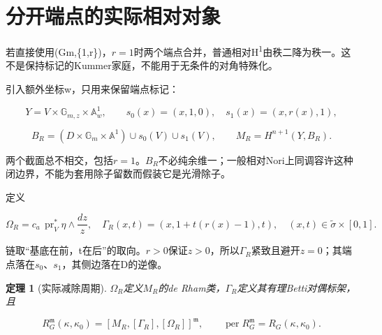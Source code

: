 \documentclass[11pt,a4paper,oneside]{ctexrep}
\theoremstyle{cnplain}
\newtheorem{theorem}{定理}[chapter]
\theoremstyle{definition}
\theoremstyle{remark}
\begin{document}
\section{分开端点的实际相对对象}\label{sec:primitive:4}

若直接使用(Gm,\{1,r\})，\(r=1\)时两个端点合并，普通相对H\textsuperscript{1}由秩二降为秩一。这不是保持标记的Kummer家庭，不能用于无条件的对角特殊化。

引入额外坐标w，只用来保留端点标记：

\begin{equation}
Y=V\times\mathbb G_{m,z}\times\mathbb A^1_w,\qquad
 s_0(x)=(x,1,0),\quad s_1(x)=(x,r(x),1),
\end{equation}

\begin{equation}
B_R=(D\times\mathbb G_m\times\mathbb A^1)
                          \cup s_0(V)\cup s_1(V),\qquad
                M_R=H^{n+1}(Y,B_R).                              \label{eq:primitive:10}
\end{equation}

两个截面总不相交，包括\(r=1\)。\(B_R\)不必纯余维一；一般相对Nori上同调容许这种闭边界，不能为套用除子留数而假装它是光滑除子。

定义

\begin{equation}
\Omega_R=c_a\,\operatorname{pr}_V^*\eta\wedge\frac{dz}{z},
\quad\Gamma_R(x,t)=(x,1+t(r(x)-1),t),\quad
 (x,t)\in\widetilde\sigma\times[0,1].                            \label{eq:primitive:11}
\end{equation}

链取``基底在前，t在后''的取向。\(r>0\)保证\(z>0\)，所以\(\Gamma _R\)紧致且避开\(z=0\)；其端点落在\(s_0\)、\(s_1\)，其侧边落在D的逆像。

\begin{theorem}[实际减除周期]

\label{thm:primitive:4.1} \(\Omega _R\)定义\(M_R\)的de Rham类，\(\Gamma _R\)定义其有理Betti对偶标架，且

\begin{equation}
R_G^{\mathfrak m}(\kappa,\kappa_0)
           =[M_R,[\Gamma_R],[\Omega_R]]^{\mathfrak m},\qquad
          \operatorname{per}R_G^{\mathfrak m}=R_G(\kappa,\kappa_0).           \label{eq:primitive:12}
\end{equation}

\end{theorem}
\end{document}
